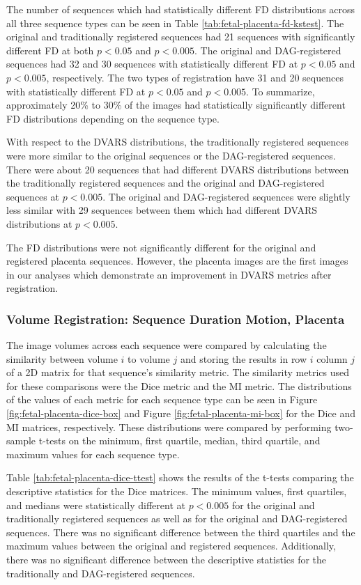 The number of sequences which had statistically different FD distributions across all three sequence types can be seen in Table \ref{tab:fetal-placenta-fd-kstest}. The original and traditionally registered sequences had 21 sequences with significantly different FD at both $p < 0.05$ and $p < 0.005$. The original and DAG-registered sequences had 32 and 30 sequences with statistically different FD at $p < 0.05$ and $p < 0.005$, respectively. The two types of registration have 31 and 20 sequences with statistically different FD at $p < 0.05$ and $p < 0.005$. To summarize, approximately 20\% to 30\% of the images had statistically significantly different FD distributions depending on the sequence type.

With respect to the DVARS distributions, the traditionally registered sequences were more similar to the original sequences or the DAG-registered sequences. There were about 20 sequences that had different DVARS distributions between the traditionally registered sequences and the original and DAG-registered sequences at $p < 0.005$. The original and DAG-registered sequences were slightly less similar with 29 sequences between them which had different DVARS distributions at $p < 0.005$.

The FD distributions were not significantly different for the original and registered placenta sequences. However, the placenta images are the first images in our analyses which demonstrate an improvement in DVARS metrics after registration.

\subsubsection{Volume Registration: Sequence Duration Motion, Placenta}

The image volumes across each sequence were compared by calculating the similarity between volume $i$ to volume $j$ and storing the results in row $i$ column $j$ of a 2D matrix for that sequence's similarity metric. The similarity metrics used for these comparisons were the Dice metric and the MI metric. The distributions of the values of each metric for each sequence type can be seen in Figure \ref{fig:fetal-placenta-dice-box} and Figure \ref{fig:fetal-placenta-mi-box} for the Dice and MI matrices, respectively. These distributions were compared by performing two-sample t-tests on the minimum, first quartile, median, third quartile, and maximum values for each sequence type. 

Table \ref{tab:fetal-placenta-dice-ttest} shows the results of the t-tests comparing the descriptive statistics for the Dice matrices. The minimum values, first quartiles, and medians were statistically different at $p < 0.005$ for the original and traditionally registered sequences as well as for the original and DAG-registered sequences. There was no significant difference between the third quartiles and the maximum values between the original and registered sequences. Additionally, there was no significant difference between the descriptive statistics for the traditionally and DAG-registered sequences.

